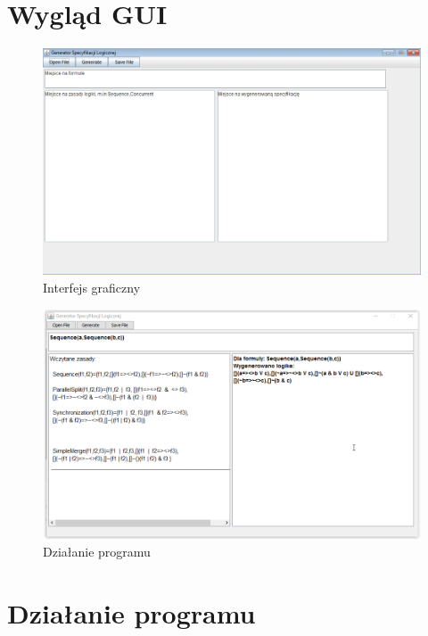 \documentclass[a4paper, 11pt]{article}
\begin{document}
	\section{Wygląd GUI}
	
	\begin{figure}[H]
	\centerline{\includegraphics[scale=0.6]{GUI}}
	\caption{Interfejs graficzny}
	\end{figure}%
	
	\begin{figure}[H]
	\centerline{\includegraphics[scale=0.6]{program}}
	\caption{Działanie programu}
	\end{figure}%
	
	
	
	\section{Działanie programu}
\end{document}
